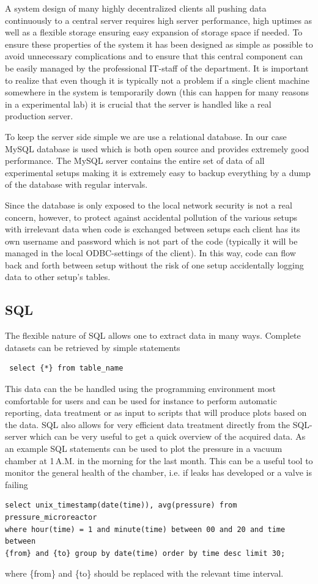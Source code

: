 A system design of many highly decentralized clients all pushing data
continuously to a central server requires high server performance, high uptimes
as well as a flexible storage ensuring easy expansion of storage space if
needed. To ensure these properties of the system it has been designed as simple
as possible to avoid unnecessary complications and to ensure that this central
component can be easily managed by the professional IT-staff of the department.
It is important to realize that even though it is typically not a problem if a
single client machine somewhere in the system is temporarily down (this can
happen for many reasons in a experimental lab) it is crucial that the server is
handled like a real production server.

To keep the server side simple we are use a relational database. In our case
MySQL\cite{mysql} database is used which is both open source and provides
extremely good performance. The MySQL server contains the entire set of data
of all experimental setups making it is extremely easy to backup everything by
a dump of the database with regular intervals.

Since the database is only exposed to the local network security is not a real
concern, however, to protect against accidental pollution of the various setups
with irrelevant data when code is exchanged between setups each client has its
own username and password which is not part of the code (typically it will be
managed in the local ODBC-settings of the client). In this way, code can flow
back and forth between setup without the risk of one setup accidentally logging
data to other setup's tables.

\subsection{SQL} The flexible nature of SQL allows one to extract data in many
ways. Complete datasets can be retrieved by simple statements
\begin{verbatim}
 select {*} from table_name
\end{verbatim}

This data can the be handled using the programming environment most comfortable
for users and can be used for instance to perform automatic reporting, data
treatment or as input to scripts that will produce plots based on the data. SQL
also allows for very efficient data treatment directly from the SQL-server
which can be very useful to get a quick overview of the acquired data. As an
example SQL statements can be used to plot the pressure in a vacuum chamber at
1\,A.M. in the morning for the last month. This can be a useful tool to monitor
the general health of the chamber, i.e. if leaks has developed or a valve is
failing
\begin{verbatim}
select unix_timestamp(date(time)), avg(pressure) from pressure_microreactor
where hour(time) = 1 and minute(time) between 00 and 20 and time between
{from} and {to} group by date(time) order by time desc limit 30;
\end{verbatim}
where \{from\}  and \{to\} should be replaced with the relevant time interval.

